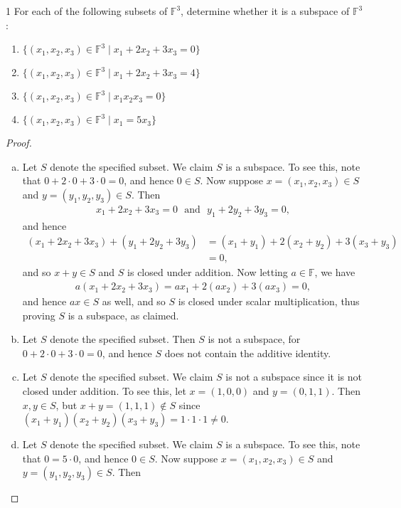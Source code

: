 \documentclass{extarticle}
\newenvironment{problem}[1]{\begin{prob*}{#1}{}}{\end{prob*}}
\newcommand{\F}{\mathbb{F}}
\begin{document}
\begin{problem}{1}
For each of the following subsets of $\F^3$, determine whether it is a subspace of $\F^3$:
\begin{enumerate}
\item $\{(x_1, x_2, x_3)\in\F^3 \mid x_1 +2x_2 +3x_3 = 0\}$
\item $\{(x_1, x_2, x_3)\in\F^3 \mid x_1 +2x_2 +3x_3 = 4\}$
\item $\{(x_1, x_2, x_3)\in\F^3 \mid x_1x_2x_3 = 0\}$
\item $\{(x_1, x_2, x_3)\in\F^3 \mid x_1 = 5x_3\}$ 
\end{enumerate}
\end{problem}
\begin{proof}
\begin{enumerate}[(a)]
\item Let $S$ denote the specified subset.  We claim $S$ is a subspace.  To see this, note that $0 + 2\cdot 0 + 3\cdot 0 = 0$, and hence $0\in S$.  Now suppose $x = (x_1, x_2, x_3)\in S$ and $y=(y_1,y_2,y_3)\in S$.  Then
\begin{align*}
x_1 +2x_2 +3x_3 = 0 ~~~ \text{and} ~~~ y_1 + 2y_2 + 3y_3 = 0,
\end{align*}
and hence
\begin{align*}
(x_1 + 2x_2 + 3x_3) + (y_1 + 2y_2 + 3y_3) &= (x_1 + y_1) + 2(x_2 + y_2) + 3(x_3 + y_3)\\ 
&= 0,
\end{align*}
and so $x+y\in S$ and $S$ is closed under addition.  Now letting $a\in\F$, we have
\begin{align*}
a(x_1 + 2x_2 + 3x_3) = ax_1 + 2(ax_2) + 3(ax_3) = 0, 
\end{align*}
and hence $ax\in S$ as well, and so $S$ is closed under scalar multiplication, thus proving $S$ is a subspace, as claimed.
\item Let $S$ denote the specified subset.  Then $S$ is not a subspace, for $0 + 2\cdot 0 + 3\cdot 0 = 0$, and hence $S$ does not contain the additive identity.
\item Let $S$ denote the specified subset.  We claim $S$ is not a subspace since it is not closed under addition.  To see this, let $x = (1, 0, 0)$ and $y = (0, 1, 1)$.  Then $x,y\in S$, but $x + y = (1, 1, 1)\not\in S$ since $(x_1 + y_1)(x_2 + y_2)(x_3 + y_3) = 1 \cdot 1 \cdot 1 \neq  0$.
\item Let $S$ denote the specified subset.  We claim $S$ is a subspace.  To see this, note that $0 = 5\cdot 0$, and hence $0\in S$.  Now suppose $x = (x_1, x_2, x_3)\in S$ and $y=(y_1,y_2,y_3)\in S$.  Then

\end{enumerate}
\end{proof}
\end{document}
